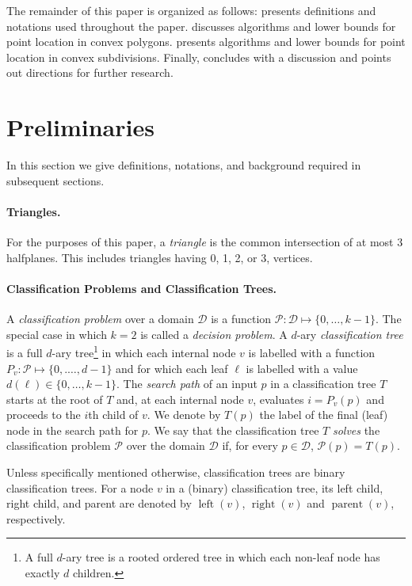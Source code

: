 \documentclass[charterfonts,lotsofwhite]{patmorin}
\DeclareMathOperator{\lft}{left}
\DeclareMathOperator{\rght}{right}
\DeclareMathOperator{\prnt}{parent}
\begin{document}
The remainder of this paper is organized as follows:  
presents definitions and notations used throughout the paper.
 discusses algorithms and lower bounds for point
location in convex polygons.   presents algorithms
and lower bounds for point location in convex subdivisions.  Finally,
 concludes with a discussion and points out
directions for further research.


\section{Preliminaries}

In this section we give definitions, notations, and background
required in subsequent sections.

\paragraph{Triangles.}  For the purposes of this paper, a
\emph{triangle} is the common intersection of at most 3 halfplanes.
This includes triangles having 0, 1, 2, or 3, vertices.  

\paragraph{Classification Problems and Classification Trees.}

A \emph{classification problem} over a domain $\mathcal{D}$ is a
function $\mathcal{P}:\mathcal{D}\mapsto \{0,\ldots,k-1\}$.  The
special case in which $k=2$ is called a \emph{decision problem}.  A
$d$-ary \emph{classification tree} is a full $d$-ary tree\footnote{A
full $d$-ary tree is a rooted ordered tree in which each non-leaf node
has exactly $d$ children.} in which each internal node $v$ is labelled
with a function $P_v:\mathcal{P}\mapsto\{0,.\ldots,d-1\}$ and for
which each leaf $\ell$ is labelled with a value
$d(\ell)\in\{0,\ldots,k-1\}$. The \emph{search path} of an input $p$
in a classification tree $T$ starts at the root of $T$ and, at each
internal node $v$, evaluates $i=P_v(p)$ and proceeds to the $i$th
child of $v$.  We denote by $T(p)$ the label of the final (leaf) node
in the search path for $p$.  We say that the classification tree $T$
\emph{solves} the classification problem $\mathcal{P}$ over the domain
$\mathcal{D}$ if, for every $p\in \mathcal{D}$, $\mathcal{P}(p)=T(p)$.

Unless specifically mentioned otherwise, classification trees are
binary classification trees.  For a node $v$ in a (binary)
classification tree, its left child, right child, and parent are
denoted by $\lft(v)$, $\rght(v)$ and $\prnt(v)$, respectively.
\end{document}
